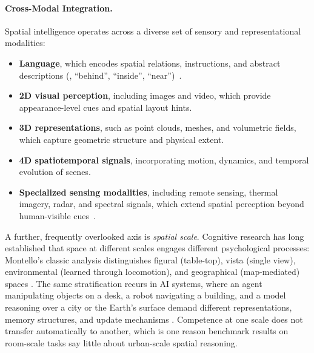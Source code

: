 \paragraph{Cross-Modal Integration.}
Spatial intelligence operates across a diverse set of sensory and representational modalities:
\begin{itemize}[leftmargin=2em,itemsep=0.35em]
    \item \textbf{Language}, which encodes spatial relations, instructions, and abstract descriptions (\eg, ``behind'', ``inside'', ``near'')~\cite{landau1993whence}.
    \item \textbf{2D visual perception}, including images and video, which provide appearance-level cues and spatial layout hints.
    \item \textbf{3D representations}, such as point clouds, meshes, and volumetric fields, which capture geometric structure and physical extent.
    \item \textbf{4D spatiotemporal signals}, incorporating motion, dynamics, and temporal evolution of scenes.
    \item \textbf{Specialized sensing modalities}, including remote sensing, thermal imagery, radar, and spectral signals, which extend spatial perception beyond human-visible cues~\cite{cong2022satmae,sun2022ringmo}.
\end{itemize}
A further, frequently overlooked axis is \emph{spatial scale}.
Cognitive research has long established that space at different scales engages different psychological processes: Montello's classic analysis distinguishes figural (table-top), vista (single view), environmental (learned through locomotion), and geographical (map-mediated) spaces \cite{montello1993scale}.
The same stratification recurs in AI systems, where an agent manipulating objects on a desk, a robot navigating a building, and a model reasoning over a city or the Earth's surface demand different representations, memory structures, and update mechanisms \cite{feng2025survey}.
Competence at one scale does not transfer automatically to another, which is one reason benchmark results on room-scale tasks say little about urban-scale spatial reasoning.


